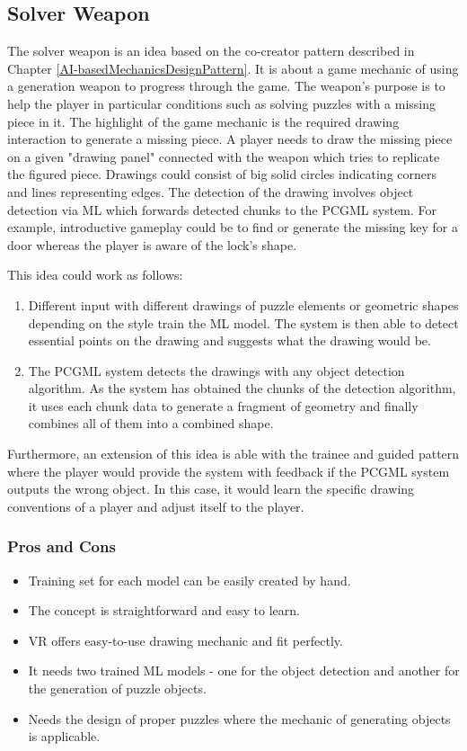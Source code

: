 \documentclass[MGS,Master,english]{twbook}%
\begin{document}
\subsection{Solver Weapon} \label{idea::solverWeapon}
The solver weapon is an idea based on the co-creator pattern described in Chapter \ref{AI-basedMechanicsDesignPattern}. It is about a game mechanic of using a generation weapon to progress through the game. The weapon's purpose is to help the player in particular conditions such as solving puzzles with a missing piece in it. The highlight of the game mechanic is the required drawing interaction to generate a missing piece. A player needs to draw the missing piece on a given "drawing panel" connected with the weapon which tries to replicate the figured piece. Drawings could consist of big solid circles indicating corners and lines representing edges. The detection of the drawing involves object detection via ML which forwards detected chunks to the PCGML system. For example, introductive gameplay could be to find or generate the missing key for a door whereas the player is aware of the lock's shape.

This idea could work as follows: 
\begin{enumerate}
	\item Different input with different drawings of puzzle elements or geometric shapes depending on the style train the ML model. The system is then able to detect essential points on the drawing and suggests what the drawing would be.
	\item The PCGML system detects the drawings with any object detection algorithm. As the system has obtained the chunks of the detection algorithm, it uses each chunk data to generate a fragment of geometry and finally combines all of them into a combined shape.
\end{enumerate}

Furthermore, an extension of this idea is able with the trainee and guided pattern where the player would provide the system with feedback if the PCGML system outputs the wrong object. In this case, it would learn the specific drawing conventions of a player and adjust itself to the player.

\subsubsection{Pros and Cons}
\begin{itemize}
	\item Training set for each model can be easily created by hand.
	\item The concept is straightforward and easy to learn.
	\item \ac{VR} offers easy-to-use drawing mechanic and fit perfectly.
	\item It needs two trained ML models - one for the object detection and another for the generation of puzzle objects. 
	\item Needs the design of proper puzzles where the mechanic of generating objects is applicable.
\end{itemize}
\end{document}
